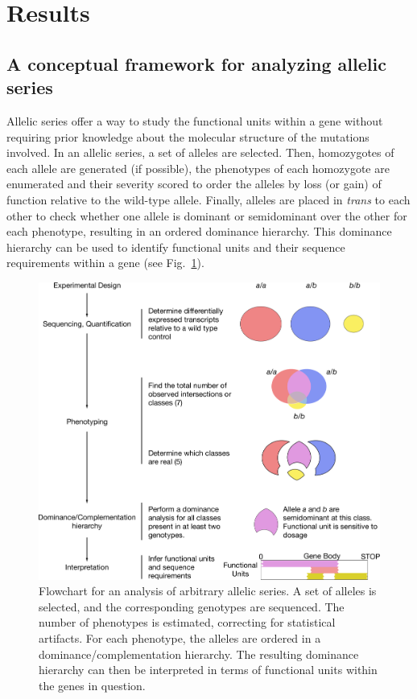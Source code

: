\documentclass[10pt, twocolumn]{article}
\begin{document}
\section*{Results}
\subsection*{A conceptual framework for analyzing allelic series}
Allelic series offer a way to study the functional units within a gene without
requiring prior knowledge about the molecular structure of the mutations
involved. In an allelic series, a set of alleles are selected. Then, homozygotes
of each allele are generated (if possible), the phenotypes of each homozygote
are enumerated and their severity scored to order the alleles by loss (or gain)
of function relative to the wild-type allele. Finally, alleles are placed in
\emph{trans} to each other to check whether one allele is dominant or
semidominant over the other for each phenotype, resulting in an ordered
dominance hierarchy. This dominance hierarchy can be used to identify functional
units and their sequence requirements within a gene (see
Fig.~\ref{fig:flowchart}).

\begin{figure}
  \centering{}
  \includegraphics[width=\textwidth]{../figs/flowchart.pdf}
  \caption{Flowchart for an analysis of arbitrary allelic series. A set of
  alleles is selected, and the corresponding genotypes are sequenced. The number
  of phenotypes is estimated, correcting for statistical artifacts. For each
  phenotype, the alleles are ordered in a dominance/complementation hierarchy.
  The resulting dominance hierarchy can then be interpreted in terms of
  functional units within the genes in question.}
\label{fig:flowchart}
\end{figure}
\end{document}
